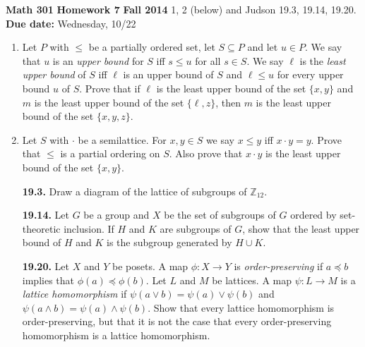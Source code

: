 \documentclass[12pt,reqno]{amsart}
\newcommand{\boldemph}{\emph}
\newcommand{\probskip}{\vskip1cm}
\begin{document}
\thispagestyle{empty}

\noindent \textbf{Math 301} \hskip5cm {\bf Homework 7} \hfill {\bf Fall 2014}
\vskip1cm
 1, 2 (below) and Judson 19.3, 19.14, 19.20.\\
{\bf Due date:} Wednesday, 10/22

\bigskip

\begin{enumerate}[{\bf 1.}]

\item %
Let $P$ with $\leq$ be a partially ordered set, let $S \subseteq P$ and let
$u\in P$.  We say that $u$ is an \emph{upper bound} for $S$ iff $s\leq u$ for
all $s \in S$.  We say $\ell$ is the \emph{least upper bound} of $S$ iff $\ell$
is an upper bound of $S$ and $\ell \leq u$ for every upper bound $u$ of $S$.
Prove that if $\ell$ is the least upper bound of the set $\{x, y\}$ and $m$ is
the least upper bound of the set $\{\ell, z\}$, then $m$ is the least upper
bound of the set $\{x, y, z\}$.

\probskip

\item
Let $S$ with $\cdot$ be a semilattice.  For $x, y\in S$ we say $x\leq y$ iff
$x\cdot y  = y$. Prove that $\leq$ is a partial ordering on $S$.  Also prove
that $x\cdot y$ is the least upper bound of the set $\{x,y\}$.

\probskip
 
\item[{\bf 19.3.}] 
Draw a diagram of the lattice of subgroups of ${\mathbb Z}_{12}$.
 
 
\probskip

\item[{\bf 19.14.}] 
Let $G$ be a group and $X$ be the set of subgroups of $G$ ordered by
set-theoretic inclusion. If $H$ and $K$ are subgroups of $G$, show
that the least upper bound of $H$ and $K$ is the subgroup generated by
$H \cup K$. 
 
\probskip
 
\item[{\bf 19.20.}] 
Let $X$ and $Y$ be posets.  A map $\phi : X \rightarrow Y$ is \boldemph{
order-preserving} if $a \preceq b$
implies that $\phi(a) \preceq \phi(b)$.  Let $L$ and $M$ be lattices.
A map $\psi: L \rightarrow M$ is a \boldemph{lattice
homomorphism}
if $\psi( a \vee b ) = \psi(a) \vee \psi(b)$ and $\psi( a \wedge b ) =
\psi(a) \wedge \psi(b)$. Show that every lattice homomorphism is
order-preserving, but that it is not the case that every
order-preserving homomorphism is a lattice homomorphism.  
 
 
 
\end{enumerate}
\end{document}
